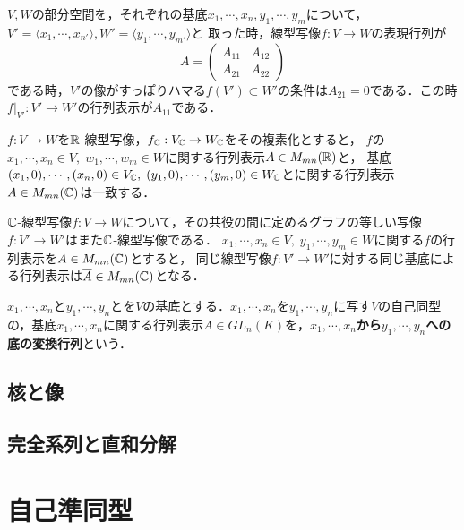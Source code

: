 \documentclass[uplatex, 12pt, dvipdfmx]{jsreport}
\begin{document}
\begin{example}[誘導される部分空間の射]
    $V,W$の部分空間を，それぞれの基底$x_1,\cdots,x_n,y_1,\cdots,y_m$について，$V'=\langle x_1,\cdots,x_{n'}\rangle,W'=\langle y_1,\cdots,y_{m'}\rangle$と
    取った時，線型写像$f:V\to W$の表現行列が
    \[ A=\begin{pmatrix}A_{11}&A_{12}\\A_{21}&A_{22}\end{pmatrix} \]
    である時，$V'$の像がすっぽりハマる$f(V')\subset W'$の条件は$A_{21}=0$である．この時$f|_{V'}:V'\to W'$の行列表示が$A_{11}$である．
\end{example}

\begin{example}[複素化の表現行列]
    $f:V\to W$を$\mathbb{R}$-線型写像，$f_{\mathbb{C}}:V_{\mathbb{C}}\to W_{\mathbb{C}}$をその複素化とすると，
    $f$の$x_1,\cdots,x_n\in V,\;w_1,\cdots,w_m\in W$に関する行列表示$A\in M_{mn}(\mathbb{R})$と，
    基底$(x_1,0),\cdots,(x_n,0)\in V_{\mathbb{C}},\;(y_1,0),\cdots,(y_m,0)\in W_{\mathbb{C}}$とに関する行列表示$A\in M_{mn}(\mathbb{C})$は一致する．
\end{example}

\begin{example}[共役の行列表示]
    $\mathbb{C}$-線型写像$f:V\to W$について，その共役の間に定めるグラフの等しい写像$f:V'\to W'$はまた$\mathbb{C}$-線型写像である．
    $x_1,\cdots,x_n\in V,\;y_1,\cdots,y_m\in W$に関する$f$の行列表示を$A\in M_{mn}(\mathbb{C})$とすると，
    同じ線型写像$f:V'\to W'$に対する同じ基底による行列表示は$\overline{A}\in M_{mn}(\mathbb{C})$となる．
\end{example}

\begin{definition}
    $x_1,\cdots,x_n$と$y_1,\cdots,y_n$とを$V$の基底とする．$x_1,\cdots,x_n$を$y_1,\cdots,y_n$に写す$V$の自己同型の，基底$x_1,\cdots,x_n$に関する行列表示$A\in GL_n(K)$を，\textbf{$x_1,\cdots,x_n$から$y_1,\cdots,y_n$への底の変換行列}という．
\end{definition}

\section{核と像}

\section{完全系列と直和分解}

\chapter{自己準同型}
\end{document}
